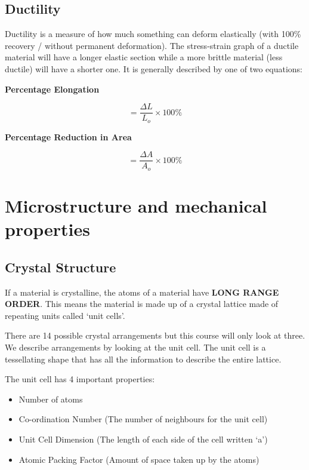 \documentclass[12pt]{article}
\begin{document}
\subsection{Ductility}
Ductility is a measure of how much something can deform elastically (with 100\% recovery / without permanent deformation).
The stress-strain graph of a ductile material will have a longer elastic section while a more brittle material (less ductile) will have a shorter one.
It is generally described by one of two equations: 

\begin{center}
  \textbf{Percentage Elongation}
\end{center}
\begin{equation*}
  = \frac{\Delta L}{L_o} \times 100\% 
\end{equation*}

\begin{center}
  \textbf{Percentage Reduction in Area}
\end{center}
\begin{equation*}
  = \frac{\Delta A}{A_o} \times 100\% 
\end{equation*}

\section{Microstructure and mechanical properties}
\subsection{Crystal Structure}
\begin{definition*}
  If a material is crystalline, the atoms of a material have \textbf{LONG RANGE ORDER}. 
  This means the material is made up of a crystal lattice made of repeating units called `unit cells'. 
\end{definition*}

There are 14 possible crystal arrangements but this course will only look at three. 
We describe arrangements by looking at the unit cell. 
The unit cell is a tessellating shape that has all the information to describe the entire lattice.

The unit cell has 4 important properties: 
\begin{itemize}
  \item Number of atoms 
  \item Co-ordination Number (The number of neighbours for the unit cell)
  \item Unit Cell Dimension (The length of each side of the cell written `a')
  \item Atomic Packing Factor (Amount of space taken up by the atoms)
\end{itemize}
\end{document}
